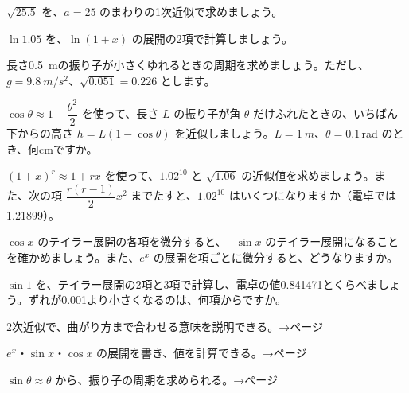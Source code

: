 \bkproblem $\sqrt{25.5}$ を、$a=25$ のまわりの1次近似で求めましょう。

\bkproblem $\ln1.05$ を、$\ln(1+x)$ の展開の2項で計算しましょう。

\bkproblem 長さ\qty{0.5}{m}の振り子が小さくゆれるときの周期を求めましょう。ただし、$g=\qty{9.8}{m/s^2}$、$\sqrt{0.051}=0.226$ とします。


\bkproblem $\cos\theta\approx1-\dfrac{\theta^2}{2}$ を使って、長さ $L$ の振り子が角 $\theta$ だけふれたときの、いちばん下からの高さ $h=L(1-\cos\theta)$ を近似しましょう。$L=\qty{1}{m}$、$\theta=0.1$\,rad のとき、何cmですか。

\bkproblem $(1+x)^r\approx1+rx$ を使って、$1.02^{10}$ と $\sqrt{1.06}$ の近似値を求めましょう。また、次の項 $\dfrac{r(r-1)}{2}x^2$ までたすと、$1.02^{10}$ はいくつになりますか（電卓では1.21899）。

\bkproblem $\cos x$ のテイラー展開の各項を微分すると、$-\sin x$ のテイラー展開になることを確かめましょう。また、$e^x$ の展開を項ごとに微分すると、どうなりますか。

\bkproblem $\sin1$ を、テイラー展開の2項と3項で計算し、電卓の値0.841471とくらべましょう。ずれが0.001より小さくなるのは、何項からですか。

\begin{furikaeri}
\begin{checklist}
\item 2次近似で、曲がり方まで合わせる意味を説明できる。\hfill{\footnotesize\sffamily\color{bkTheme}→\pageref{bk:5-17:niji}ページ}
\item $e^x$・$\sin x$・$\cos x$ の展開を書き、値を計算できる。\hfill{\footnotesize\sffamily\color{bkTheme}→\pageref{bk:5-17:sin}ページ}
\item $\sin\theta\approx\theta$ から、振り子の周期を求められる。\hfill{\footnotesize\sffamily\color{bkTheme}→\pageref{bk:5-17:furiko}ページ}
\end{checklist}
\end{furikaeri}

